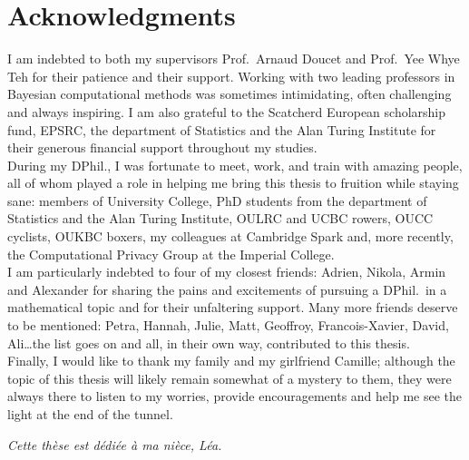 



\section*{Acknowledgments}

I am indebted to both my supervisors Prof.\ Arnaud Doucet and Prof.\ Yee Whye Teh for their patience and their support.
Working with two leading professors in Bayesian computational methods  was sometimes intimidating, often challenging and always inspiring. I am also grateful to the Scatcherd European scholarship fund, EPSRC, the department of Statistics and the Alan Turing Institute for their generous financial support throughout my studies.\\
During my DPhil., I was fortunate to meet, work, and train with amazing people, all of whom played a role in helping me bring this thesis to fruition while staying sane: members of University College, PhD students from the department of Statistics and the Alan Turing Institute, OULRC and UCBC rowers, OUCC cyclists, OUKBC boxers, my colleagues at Cambridge Spark and, more recently, the  Computational Privacy Group at the Imperial College.\\
I am particularly indebted to four of my closest friends: Adrien, Nikola, Armin and Alexander for sharing the pains and excitements of pursuing a DPhil.\ in a mathematical topic and for their unfaltering support.
Many more friends deserve to be mentioned: Petra, Hannah, Julie, Matt, Geoffroy, Francois-Xavier, David, Ali\dots the list goes on and all, in their own way, contributed to this thesis.
\\
Finally, I would like to thank my family and my girlfriend Camille; although the topic of this thesis will likely remain somewhat of a mystery to them, they were always there to listen to my worries, provide encouragements and help me see the light at the end of the tunnel.



\vspace*{1cm}
\begin{flushright}
\emph{Cette th\`ese est d\'edi\'ee \`a ma ni\`ece, L\'ea.}
\end{flushright}